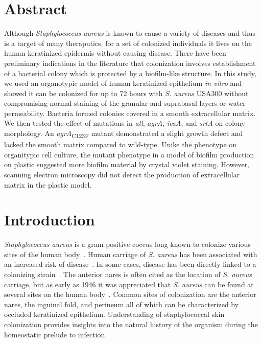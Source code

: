 \documentclass[10pt,letterpaper]{article}
\begin{document}
\section*{Abstract}
Although \textit{Staphylococcus aureus} is known to cause a variety of diseases and thus is a target of many theraputics, for a set of colonized individuals it lives on the human keratinized epidermis without causing disease.
There have been preliminary indications in the literature that colonization involves establishment of a bacterial colony which is protected by a biofilm-like structure.
In this study, we used an organotypic model of human keratinized epithelium \textit{in vitro} and showed it can be colonized for up to 72 hours with \textit{S. aureus} USA300 without compromising normal staining of the granular and suprabasal layers or water permeability.
Bacteria formed colonies covered in a smooth extracellular matrix.
We then tested the effect of mutations in \textit{atl}, \textit{agrA}, 
\textit{icaA}, and \textit{srtA} on colony morphology.
An \textit{agrA}\textsubscript{C123F} mutant demonstrated a slight growth defect and lacked the smooth matrix compared to wild-type.
Unike the phenotype on organitypic cell culture, the mutant phenotype in a model of biofilm production on plastic suggested more biofilm material by crystal violet staining.
However, scanning electron microscopy did not detect the production of extracellular matrix in the plastic model.


\linenumbers

\section*{Introduction}

\textit{Staphylococcus aureus} is a gram positive coccus long known to colonize various sites of the human body~\cite{miko_high_2012,williams_healthy_1963,mermel_methicillin-resistant_2011}.
Human carriage of \textit{S. aureus} has been associated with an increased risk of disease~\cite{wertheim_risk_2004}.
In some cases, disease has been directly linked to a colonizing strain~\cite{von_eiff_nasal_2001, toshkova_significance_2001}.
The anterior nares is often cited as the location of \textit{S. aureus} carriage, but as early as 1946 it was appreciated that \textit{S. aureus} can be found at several sites on the human body~\cite{williams_skin_1946}.
Common sites of colonization are the anterior nares, the inguinal fold, and perineum all of which can be characterized by occluded keratinized epithelium.
Understanding of staphylococcal skin colonization provides insights into the natural history of the organism during the homeostatic prelude to infection.
\end{document}
